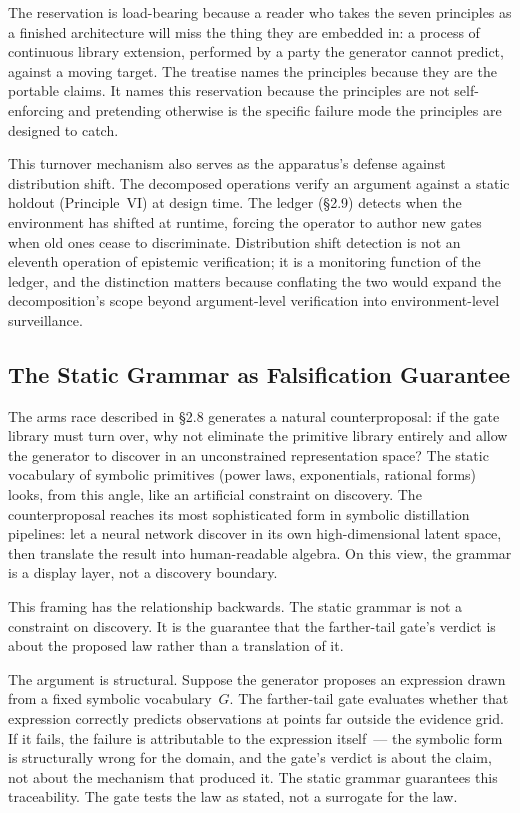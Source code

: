 \documentclass[11pt]{article}
\begin{document}
The reservation is load-bearing because a reader who takes the seven principles as a finished architecture will miss the thing they are embedded in: a process of continuous library extension, performed by a party the generator cannot predict, against a moving target. The treatise names the principles because they are the portable claims. It names this reservation because the principles are not self-enforcing and pretending otherwise is the specific failure mode the principles are designed to catch.

This turnover mechanism also serves as the apparatus's defense against distribution shift. The decomposed operations verify an argument against a static holdout (Principle~VI) at design time. The ledger (\S2.9) detects when the environment has shifted at runtime, forcing the operator to author new gates when old ones cease to discriminate. Distribution shift detection is not an eleventh operation of epistemic verification; it is a monitoring function of the ledger, and the distinction matters because conflating the two would expand the decomposition's scope beyond argument-level verification into environment-level surveillance.

\subsection{The Static Grammar as Falsification Guarantee}

The arms race described in \S2.8 generates a natural counterproposal: if the gate library must turn over, why not eliminate the primitive library entirely and allow the generator to discover in an unconstrained representation space? The static vocabulary of symbolic primitives (power laws, exponentials, rational forms) looks, from this angle, like an artificial constraint on discovery. The counterproposal reaches its most sophisticated form in symbolic distillation pipelines: let a neural network discover in its own high-dimensional latent space, then translate the result into human-readable algebra. On this view, the grammar is a display layer, not a discovery boundary.

This framing has the relationship backwards. The static grammar is not a constraint on discovery. It is the guarantee that the farther-tail gate's verdict is about the proposed law rather than a translation of it.

The argument is structural. Suppose the generator proposes an expression drawn from a fixed symbolic vocabulary~$G$. The farther-tail gate evaluates whether that expression correctly predicts observations at points far outside the evidence grid. If it fails, the failure is attributable to the expression itself~--- the symbolic form is structurally wrong for the domain, and the gate's verdict is about the claim, not about the mechanism that produced it. The static grammar guarantees this traceability. The gate tests the law as stated, not a surrogate for the law.
\end{document}
